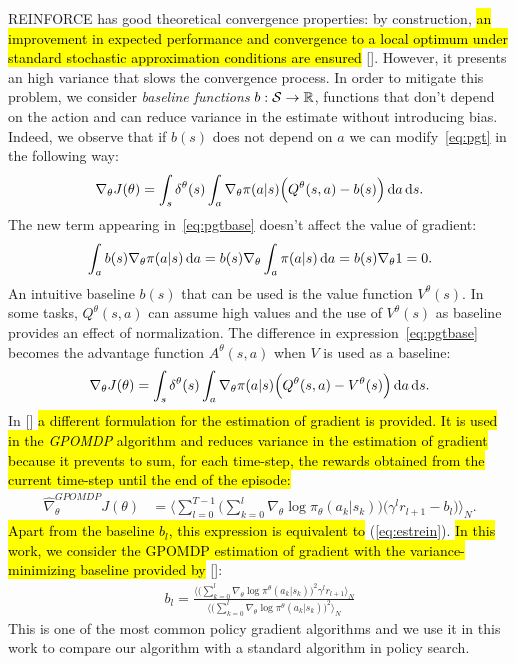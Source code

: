 \newline
REINFORCE has good theoretical convergence properties: by construction, \hl{an improvement in expected performance and convergence to a local optimum under standard stochastic approximation conditions are ensured} [\cite{sutton2018reinforcement}]. However, it presents an high variance that slows the convergence process. In order to mitigate this problem, we consider \emph{baseline functions} $b: \mathcal{S} \to \mathbb{R}$, \ie functions that don't depend on the action and can reduce variance in the estimate without introducing bias.
Indeed, we observe that if $b(s)$ does not depend on $a$ we can modify~\eqref{eq:pgt} in the following way:
\begin{align} \nabla_{\theta}J(\theta) = \int_s \delta^{\theta}(s) \int_a \nabla_{\theta} \pi(a|s) \Big( Q^{\theta}(s,a) -b(s) \Big) \,\mathrm{d} a \,\mathrm{d} s. \label{eq:pgtbase}\end{align}
The new term appearing in~\eqref{eq:pgtbase} doesn't affect the value of gradient:
\begin{align} \int_a b(s) \nabla_{\theta} \pi(a|s) \,\mathrm{d} a = b(s) \nabla_{\theta} \int_a \pi(a|s) \,\mathrm{d} a = b(s) \nabla_{\theta} 1 = 0. \end{align}
An intuitive baseline $b(s)$ that can be used is the value function $V^{\theta}(s)$. In some tasks, $Q^{\theta}(s,a)$ can assume high values and the use of $V^{\theta}(s)$ as baseline provides an effect of normalization. The difference in expression~\eqref{eq:pgtbase} becomes the advantage function $A^{\theta}(s,a)$ when $V$ is used as a baseline:
\begin{align} \nabla_{\theta}J(\theta) = \int_s \delta^{\theta}(s) \int_a \nabla_{\theta} \pi(a|s) \Big( Q^{\theta}(s,a) - V^{\theta}(s) \Big) \,\mathrm{d} a \,\mathrm{d} s.\end{align}
In [\cite{Peters2008ReinforcementLO}] \hl{a different formulation for the estimation of gradient is provided. It is used in the \emph{GPOMDP} algorithm and reduces variance in the estimation of gradient because it prevents to sum, for each time-step, the rewards obtained from the current time-step until the end of the episode:}
\begin{align}
\widehat{\nabla}_{\theta}^{GPOMDP}J(\theta) &= \Big\langle \sum_{l=0}^{T-1} \Big( \sum_{k=0}^{l} \nabla_{\theta}\log\pi_{\theta}(a_k|s_k)\Big)\Big(\gamma^{l}r_{l+1} - b_{l} \Big)  \Big\rangle_{N}.
\end{align}
\hl{Apart from the baseline $b_l$, this expression is equivalent to} (\ref{eq:estrein}). 
\hl{In this work, we consider the GPOMDP estimation of gradient with the variance-minimizing baseline provided by} [\cite{Peters2008ReinforcementLO}]:
\begin{align} b_l = \frac{\Big\langle\Big( \sum_{k=0}^{l}\nabla_{\theta} \log\pi^{\theta}(a_k|s_k)\Big)^2 \gamma^{l}r_{l+1}\Big\rangle_{N}} {\Big\langle\Big( \sum_{k=0}^{l}\nabla_{\theta} \log\pi^{\theta}(a_k|s_k)\Big)^2\Big\rangle_{N}}
\end{align} 
This is one of the most common policy gradient algorithms and we use it in this work to compare our algorithm with a standard algorithm in policy search.

